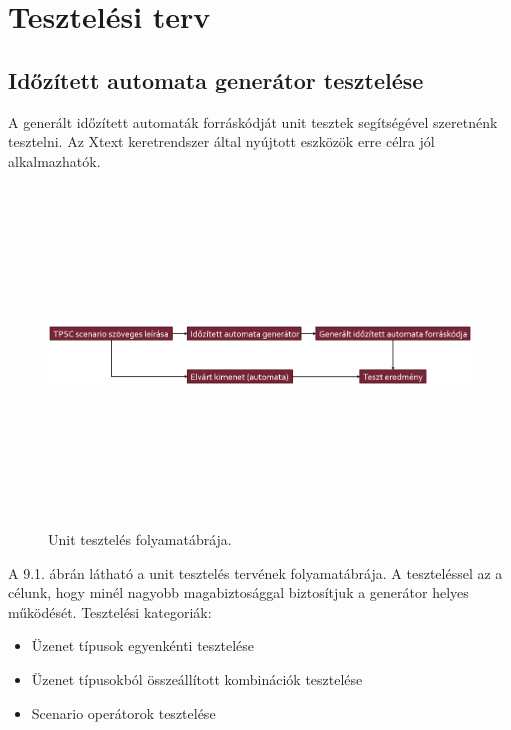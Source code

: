 \chapter{Tesztelési terv}

\section{Időzített automata generátor tesztelése}

A generált időzített automaták forráskódját unit tesztek segítségével szeretnénk tesztelni.
Az Xtext keretrendszer által nyújtott eszközök erre célra jól alkalmazhatók.

\begin{figure}[!ht]
    \centering
    \includegraphics[width=150mm, height=9cm, keepaspectratio]{figures/unit_test_flow.png}
    \caption{Unit tesztelés folyamatábrája.}
\end{figure}

A 9.1. ábrán látható a unit tesztelés tervének folyamatábrája.
A teszteléssel az a célunk, hogy minél nagyobb magabiztosággal biztosítjuk a generátor helyes működését.
Tesztelési kategoriák:

\begin{itemize}
    \item Üzenet típusok egyenkénti tesztelése
    \item Üzenet típusokból összeállított kombinációk tesztelése
    \item Scenario operátorok tesztelése
\end{itemize}


